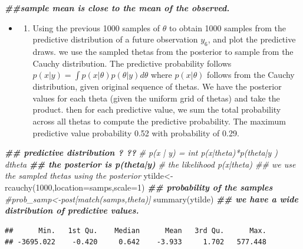 \documentclass[
]{book}
\newenvironment{Shaded}{\begin{snugshade}}{\end{snugshade}}
\newcommand{\AttributeTok}[1]{\textcolor[rgb]{0.77,0.63,0.00}{#1}}
\newcommand{\CommentTok}[1]{\textcolor[rgb]{0.56,0.35,0.01}{\textit{#1}}}
\newcommand{\DecValTok}[1]{\textcolor[rgb]{0.00,0.00,0.81}{#1}}
\newcommand{\DocumentationTok}[1]{\textcolor[rgb]{0.56,0.35,0.01}{\textbf{\textit{#1}}}}
\newcommand{\FunctionTok}[1]{\textcolor[rgb]{0.00,0.00,0.00}{#1}}
\newcommand{\NormalTok}[1]{#1}
\newcommand{\OtherTok}[1]{\textcolor[rgb]{0.56,0.35,0.01}{#1}}
\providecommand{\tightlist}{%
  \setlength{\itemsep}{0pt}\setlength{\parskip}{0pt}}
\theoremstyle{definition}
\theoremstyle{definition}
\theoremstyle{definition}
\theoremstyle{definition}
\theoremstyle{remark}
\begin{document}
\begin{Shaded}
\begin{Highlighting}[]
  \DocumentationTok{\#\#sample mean is close to the mean of the observed.}
\end{Highlighting}
\end{Shaded}

\begin{itemize}
\item
  \begin{enumerate}
  \def\labelenumi{(\alph{enumi})}
  \setcounter{enumi}{2}
  \tightlist
  \item
    Using the previous 1000 samples of \(\theta\) to obtain 1000 samples from the predictive distribution of a future observation \(y_6\), and plot the predictive draws.
    we use the sampled thetas from the posterior to sample from the Cauchy distribution. The predictive probability follows \(p(x|y) =\int p(x|\theta)p(\theta|y)d\theta\) where \(p(x|\theta)\) follows from the Cauchy distribution, given original sequence of thetas. We have the posterior values for each theta (given the uniform grid of thetas) and take the product. then for each predictive value, we sum the total probability across all thetas to compute the predictive probability. The maximum predictive value probability 0.52 with probability of 0.29.
  \end{enumerate}
\end{itemize}

\begin{Shaded}
\begin{Highlighting}[]
\DocumentationTok{\#\# predictive distribution ? ?? }
 \CommentTok{\# p(x | y) = int p(x|theta)*p(theta|y ) dtheta}
\DocumentationTok{\#\# the posterior is p(theta|y) }
 \CommentTok{\# the likelihood p(x|theta)  \#\# we use the sampled thetas using the posterior}
\NormalTok{ ytilde}\OtherTok{\textless{}{-}}\FunctionTok{rcauchy}\NormalTok{(}\DecValTok{1000}\NormalTok{,}\AttributeTok{location=}\NormalTok{samps,}\AttributeTok{scale=}\DecValTok{1}\NormalTok{) }
 \DocumentationTok{\#\# probability of the samples }
 \CommentTok{\#prob\_samp\textless{}{-}post[match(samps,theta)]}
  \FunctionTok{summary}\NormalTok{(ytilde) }\DocumentationTok{\#\# we have a wide distribution of predictive values.}
\end{Highlighting}
\end{Shaded}

\begin{verbatim}
##      Min.   1st Qu.    Median      Mean   3rd Qu.      Max. 
## -3695.022    -0.420     0.642    -3.933     1.702   577.448
\end{verbatim}
\end{document}
